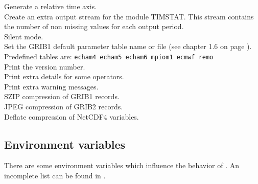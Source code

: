 \begin{tabbing}
         \> Generate a relative time axis. \\
         \> Create an extra output stream for the module TIMSTAT. This stream contains  \\
         \> the number of non missing values for each output period. \\
         \> Silent mode. \\
         \> Set the GRIB1 default parameter table name or file (see chapter 1.6 on page \pageref{PARAMETER_TABLE}).\\
         \> Predefined tables are:  {\tt echam4 echam5 echam6 mpiom1 ecmwf remo}\\
         \> Print the version number. \\
         \> Print extra details for some operators. \\
         \> Print extra warning messages. \\
         \> SZIP compression of GRIB1 records. \\
         \> JPEG compression of GRIB2 records. \\
         \> Deflate compression of NetCDF4 variables. \\
\end{tabbing}

\subsection{Environment variables}

There are some environment variables which influence the behavior of {\CDO}. 
An incomplete list can be found in .

